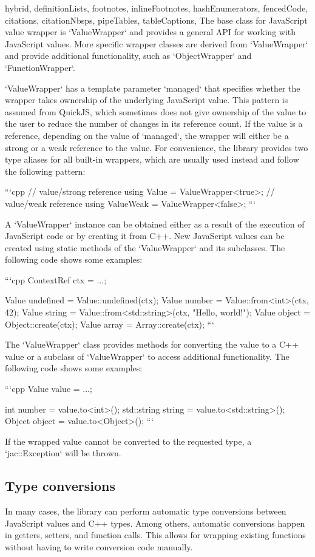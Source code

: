 \begin{markdown*}{%
  hybrid,
  definitionLists,
  footnotes,
  inlineFootnotes,
  hashEnumerators,
  fencedCode,
  citations,
  citationNbsps,
  pipeTables,
  tableCaptions,
}
The base class for JavaScript value wrapper is `ValueWrapper` and provides a general API for working with JavaScript values. More specific wrapper classes are derived from `ValueWrapper` and provide additional functionality, such as `ObjectWrapper` and `FunctionWrapper`.

`ValueWrapper` has a template parameter `managed` that specifies whether the wrapper takes ownership of the underlying JavaScript value. This pattern is assumed from QuickJS, which sometimes does not give ownership of the value to the user to reduce the number of changes in its reference count. If the value is a reference, depending on the value of `managed`, the wrapper will either be a strong or a weak reference to the value. For convenience, the library provides two type aliases for all built-in wrappers, which are usually used instead and follow the following pattern:

```cpp
// value/strong reference
using Value = ValueWrapper<true>;
// value/weak reference
using ValueWeak = ValueWrapper<false>;
```

A `ValueWrapper` instance can be obtained either as a result of the execution of JavaScript code or by creating it from C++. New JavaScript values can be created using static methods of the `ValueWrapper` and its subclasses. The following code shows some examples:

```cpp
ContextRef ctx = ...;

Value undefined = Value::undefined(ctx);
Value number = Value::from<int>(ctx, 42);
Value string = Value::from<std::string>(ctx, "Hello, world!");
Value object = Object::create(ctx);
Value array = Array::create(ctx);
```

The `ValueWrapper` class provides methods for converting the value to a C++ value or a subclass of `ValueWrapper` to access additional functionality. The following code shows some examples:

```cpp
Value value = ...;

int number = value.to<int>();
std::string string = value.to<std::string>();
Object object = value.to<Object>();
```

If the wrapped value cannot be converted to the requested type, a `jac::Exception` will be thrown.

\subsection{Type conversions}

In many cases, the library can perform automatic type conversions between JavaScript values and C++ types. Among others, automatic conversions happen in getters, setters, and function calls. This allows for wrapping existing functions without having to write conversion code manually.


\end{markdown*}

